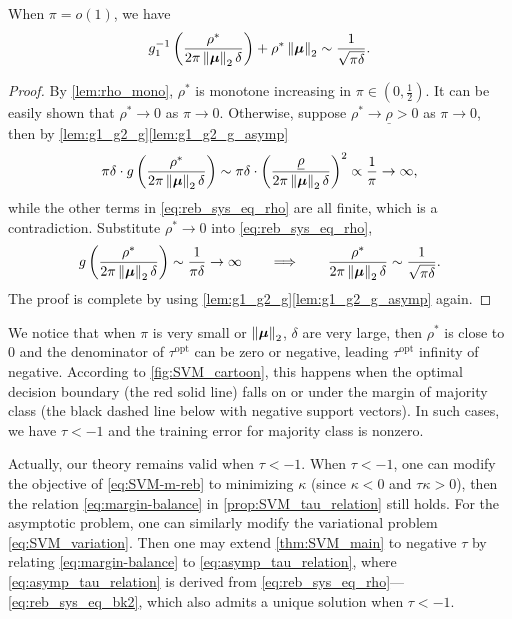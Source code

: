 \begin{lem}
    When $\pi = o(1)$, we have
    \begin{equation*}
        g_1^{-1} \left( \dfrac{\rho^*}{2 \pi \left\|{\text{\boldmath $\mu$}}\right\|_2 \delta} \right) + \rho^* \left\|{\text{\boldmath $\mu$}}\right\|_2  \sim  \frac{1}{\sqrt{\pi \delta}}.
    \end{equation*}
\end{lem}
\begin{proof}
    By \cref{lem:rho_mono}, $\rho^*$ is monotone increasing in $\pi \in (0, \frac12)$. It can be easily shown that $\rho^* \to 0$ as $\pi \to 0$. Otherwise, suppose $\rho^* \to \underline{\rho} > 0$ as $\pi \to 0$, then by \cref{lem:g1_g2_g}\ref{lem:g1_g2_g_asymp} 
\[ 
    \pi \delta \cdot g \left( \frac{\rho^*}{2 \pi \left\|{\text{\boldmath $\mu$}}\right\|_2 \delta} \right)
    \sim  \pi \delta \cdot \left( \frac{\underline{\rho}}{2 \pi \left\|{\text{\boldmath $\mu$}}\right\|_2 \delta} \right)^2 \propto \frac{1}{\pi} \to \infty,
\]
while the other terms in \cref{eq:reb_sys_eq_rho} are all finite, which is a contradiction. Substitute $\rho^* \to 0$ into \cref{eq:reb_sys_eq_rho},
\[ 
g \left( \frac{\rho^*}{2 \pi \left\|{\text{\boldmath $\mu$}}\right\|_2 \delta} \right) \sim \frac{1}{\pi\delta} \to \infty
\qquad \Longrightarrow \qquad
\frac{\rho^*}{2 \pi \left\|{\text{\boldmath $\mu$}}\right\|_2 \delta} \sim \frac{1}{\sqrt{\pi\delta}}.
\]
The proof is complete by using \cref{lem:g1_g2_g}\ref{lem:g1_g2_g_asymp} again.
\end{proof}
\begin{rem}
    We notice that when $\pi$ is very small or $\left\|{\text{\boldmath $\mu$}}\right\|_2$, $\delta$ are very large, then $\rho^*$ is close to $0$ and the denominator of $\tau^\mathrm{opt}$ can be zero or negative, leading $\tau^\mathrm{opt}$ infinity of negative. According to \cref{fig:SVM_cartoon}, this happens when the optimal decision boundary (the red solid line) falls on or under the margin of majority class (the black dashed line below with negative support vectors). In such cases, we have $\tau < -1$ and the training error for majority class is nonzero.

    Actually, our theory remains valid when $\tau < -1$. When $\tau < -1$, one can modify the objective of \cref{eq:SVM-m-reb} to minimizing $\kappa$ (since $\kappa < 0$ and $\tau \kappa > 0$), then the relation \cref{eq:margin-balance} in \cref{prop:SVM_tau_relation} still holds. For the asymptotic problem, one can similarly modify the variational problem \cref{eq:SVM_variation}. Then one may extend \cref{thm:SVM_main} to negative $\tau$ by relating \cref{eq:margin-balance} to \eqref{eq:asymp_tau_relation}, where \cref{eq:asymp_tau_relation} is derived from \cref{eq:reb_sys_eq_rho}---\eqref{eq:reb_sys_eq_bk2}, which also admits a unique solution when $\tau < -1$.
\end{rem}


